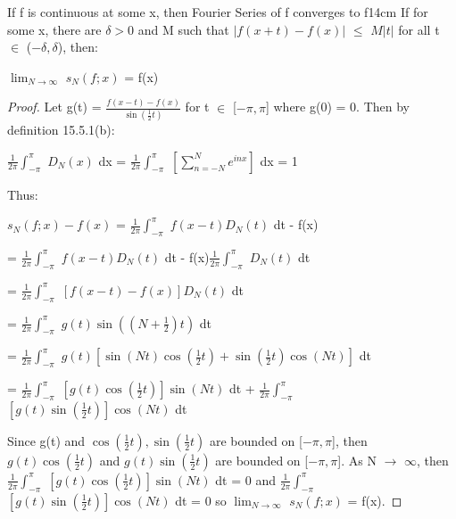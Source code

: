     \vspace{0.5cm}



    \begin{wtheorem}
    {If f is continuous at some x, then Fourier Series of f converges to f}{14cm}
        If for some x, there are $\delta > 0$ and M such that
        $|f(x+t) - f(x)|$ $\leq$ $M|t|$
        for all t $\in$ ($-\delta,\delta$), then:

        \hspace{0.5cm}
        $\lim_{N \rightarrow \infty}$ $s_N(f;x)$ = f(x)
    \end{wtheorem}

    \begin{proof}
        Let g(t) = $\frac{f(x-t) - f(x)}{\sin(\frac{1}{2}t)}$ for
        t $\in$ [$-\pi,\pi$] where g(0) = 0.
        Then by {\color{blue} definition 15.5.1(b)}:

        \hspace{0.5cm}
        $\frac{1}{2\pi} \int_{-\pi}^{\pi}$ $D_N(x)$ dx
        = $\frac{1}{2\pi} \int_{-\pi}^{\pi}$ $[\sum_{n=-N}^N e^{inx}]$ dx
        = 1

        Thus:

        \hspace{0.5cm}
        $s_N(f;x) - f(x)$
        = $\frac{1}{2\pi} \int_{-\pi}^{\pi}$ $f(x-t) D_N(t)$ dt - f(x)

        \hspace{3.2cm}
        = $\frac{1}{2\pi} \int_{-\pi}^{\pi}$ $f(x-t) D_N(t)$ dt
            - f(x)$\frac{1}{2\pi} \int_{-\pi}^{\pi}$ $D_N(t)$ dt

        \hspace{3.2cm}
        = $\frac{1}{2\pi} \int_{-\pi}^{\pi}$ $[f(x-t)-f(x)] D_N(t)$ dt

        \hspace{3.2cm}
        = $\frac{1}{2\pi} \int_{-\pi}^{\pi}$ $g(t) \sin((N+\frac{1}{2})t)$ dt

        \hspace{3.2cm}
        = $\frac{1}{2\pi} \int_{-\pi}^{\pi}$
            $g(t) [\sin(Nt)\cos(\frac{1}{2}t) + \sin(\frac{1}{2}t)\cos(Nt)]$ dt

        \hspace{3.2cm}
        = $\frac{1}{2\pi} \int_{-\pi}^{\pi}$ $[g(t)\cos(\frac{1}{2}t)]\sin(Nt)$ dt
        + $\frac{1}{2\pi} \int_{-\pi}^{\pi}$ $[g(t)\sin(\frac{1}{2}t)]\cos(Nt)$ dt

        Since g(t) and $\cos(\frac{1}{2}t),\sin(\frac{1}{2}t)$ are bounded on
        [$-\pi,\pi$], then $g(t)\cos(\frac{1}{2}t)$ and $g(t)\sin(\frac{1}{2}t)$
        are bounded on [$-\pi,\pi$].
        As N $\rightarrow$ $\infty$, then
        $\frac{1}{2\pi} \int_{-\pi}^{\pi}$
        $[g(t)\cos(\frac{1}{2}t)]\sin(Nt)$ dt = 0
        and
        $\frac{1}{2\pi} \int_{-\pi}^{\pi}$
        $[g(t)\sin(\frac{1}{2}t)]\cos(Nt)$ dt = 0
        so $\lim_{N \rightarrow \infty}$ $s_N(f;x)$ = f(x).
    \end{proof}

